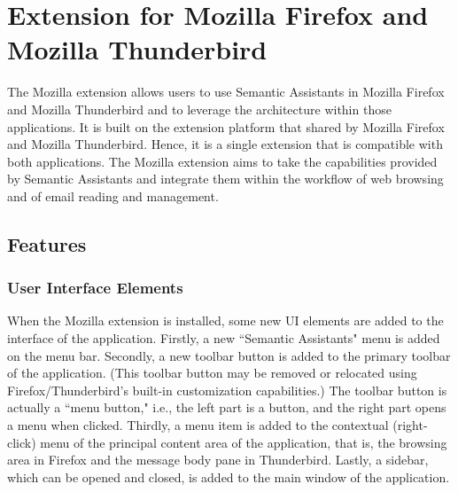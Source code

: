 %
%
%   
% 

\chapter{Extension for Mozilla Firefox and Mozilla Thunderbird} 

The Mozilla extension allows users to use Semantic Assistants in Mozilla Firefox and Mozilla Thunderbird and to leverage the \sa architecture within those applications. It is built on the extension platform that shared by Mozilla Firefox and Mozilla Thunderbird. Hence, it is a single extension that is compatible with both applications. The Mozilla extension aims to take the capabilities provided by Semantic Assistants and integrate them within the workflow of web browsing and of email reading and management. 

\section{Features}
\label{subsec:mozilla_features}

\subsection{User Interface Elements}
When the \sa Mozilla extension is installed, some new UI elements are added to the interface of the application. Firstly, a new ``Semantic Assistants" menu is added on the menu bar. Secondly, a new toolbar button is added to the primary toolbar of the application. (This toolbar button may be removed or relocated using Firefox/Thunderbird's built-in customization capabilities.) The toolbar button is actually a ``menu button," i.e., the left part is a button, and the right part opens a menu when clicked. Thirdly, a menu item is added to the contextual (right-click) menu of the principal content area of the application, that is, the browsing area in Firefox and the message body pane in Thunderbird. Lastly, a sidebar, which can be opened and closed, is added to the main window of the application. 

